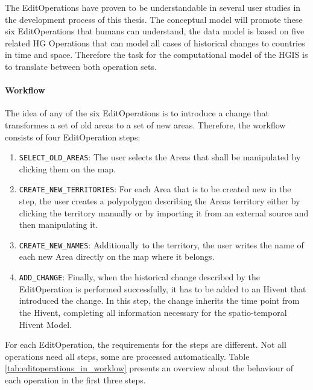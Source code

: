 The EditOperations have proven to be understandable in several user studies in the development process of this thesis. The conceptual model will promote these six EditOperations that humans can understand, the data model is based on five related HG Operations that can model all cases of historical changes to countries in time and space. Therefore the task for the computational model of the HGIS is to translate between both operation sets.


\paragraph{Workflow} %
\label{par:workflow}

The idea of any of the six EditOperations is to introduce a change that transformes a set of old areas to a set of new areas. Therefore, the workflow consists of four EditOperation steps:

\begin{enumerate}
  \item \texttt{SELECT\_OLD\_AREAS}: The user selects the Areas that shall be manipulated by clicking them on the map.
  \item \texttt{CREATE\_NEW\_TERRITORIES}: For each Area that is to be created new in the step, the user creates a polypolygon describing the Areas territory either by clicking the territory manually or by importing it from an external source and then manipulating it.
  \item \texttt{CREATE\_NEW\_NAMES}: Additionally to the territory, the user writes the name of each new Area directly on the map where it belongs.
  \item \texttt{ADD\_CHANGE}: Finally, when the historical change described by the EditOperation is performed successfully, it has to be added to an Hivent that introduced the change. In this step, the change inherits the time point from the Hivent, completing all information necessary for the spatio-temporal Hivent Model.
\end{enumerate}

For each EditOperation, the requirements for the steps are different. Not all operations need all steps, some are processed automatically. Table \ref{tab:editoperations_in_worklow} presents an overview about the behaviour of each operation in the first three steps.

